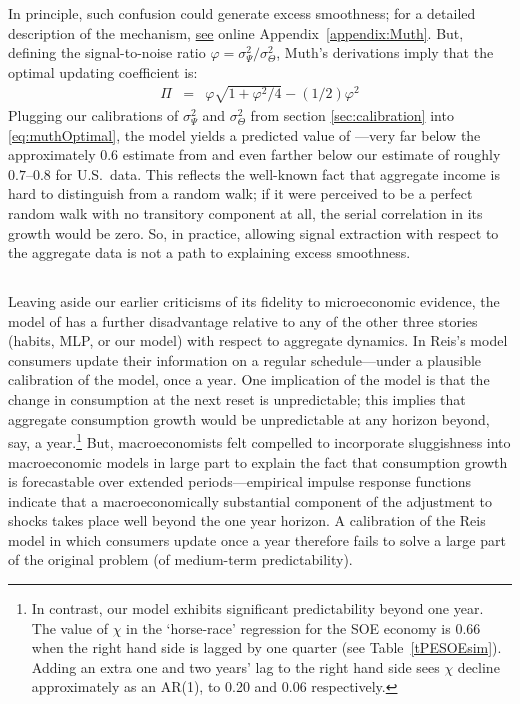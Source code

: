\documentclass[titlepage]{./econtex}
\begin{document}
In principle, such confusion could generate excess smoothness; for a detailed description of the mechanism, \hyperlink{MuthLucasPischke}{see} online Appendix~\ref{appendix:Muth}.  But, defining the signal-to-noise ratio $\varphi=\sigma^2_{\Psi}/\sigma^2_{\Theta}$, Muth's derivations imply that the optimal updating coefficient is:
  \begin{eqnarray}
\Pi & = & \varphi \sqrt{1+\varphi^{2}/4} - (1/2) \varphi^{2} \label{eq:muthOptimal}
  \end{eqnarray}
Plugging our calibrations of $\sigma^2_{\Psi}$ and $\sigma^2_{\Theta}$ from section \ref{sec:calibration} into \eqref{eq:muthOptimal}, the model yields a predicted value of ---very far below the approximately $0.6$ estimate from \cite{hrsHabit} and even farther below our estimate of roughly $0.7$--$0.8$ for U.S.\ data.  This reflects the well-known fact that aggregate income is hard to distinguish from a random walk; if it were perceived to be a perfect random walk with no transitory component at all, the serial correlation in its growth would be zero.  So, in practice, allowing signal extraction with respect to the aggregate data is not a path to explaining excess smoothness.

\subsection{\cite{reis:inattentive}}

Leaving aside our earlier criticisms of its fidelity to microeconomic evidence, the model of \cite{reis:inattentive} has a further disadvantage relative to any of the other three stories (habits, MLP, or our model) with respect to aggregate dynamics. In Reis's model consumers update their information on a regular schedule---under a plausible calibration of the model, once a year. One implication of the model is that the change in consumption at the next reset is unpredictable; this implies that aggregate consumption growth would be unpredictable at any horizon beyond, say, a year.\footnote{In contrast, our model exhibits significant predictability beyond one year. The value of $\chi$ in the `horse-race' regression for the SOE economy is 0.66 when the right hand side is lagged by one quarter (see Table~\ref{tPESOEsim}). Adding an extra one and two years' lag to the right hand side sees $\chi$ decline approximately as an AR(1), to 0.20 and 0.06 respectively.}  But, macroeconomists felt compelled to incorporate sluggishness into macroeconomic models in large part to explain the fact that consumption growth is forecastable over extended periods---empirical impulse response functions indicate that a macroeconomically substantial component of the adjustment to shocks takes place well beyond the one year horizon.  A calibration of the Reis model in which consumers update once a year therefore fails to solve a large part of the original problem (of medium-term predictability).
\end{document}
